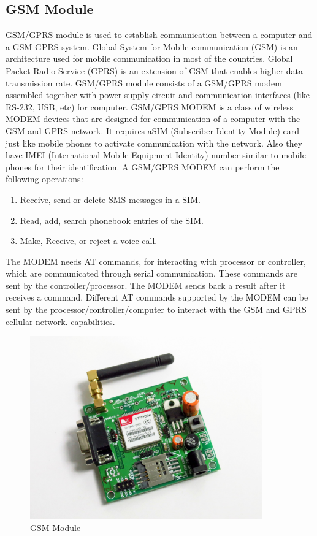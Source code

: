 \documentclass[twoside,a4paper,16pt]{book}
\begin{document}
{\subsection{GSM Module }
GSM/GPRS module is used to establish communication between a computer and a GSM-GPRS system. Global System for Mobile communication (GSM) is an architecture used for mobile communication in most of the countries. Global Packet Radio Service (GPRS) is an extension of GSM that enables higher data transmission rate. GSM/GPRS module consists of a GSM/GPRS modem assembled together with power supply circuit and communication interfaces (like RS-232, USB, etc) for computer. GSM/GPRS MODEM is a class of wireless MODEM devices that are designed for communication of a computer with the GSM and GPRS network. It requires aSIM (Subscriber Identity Module) card just like mobile phones to activate communication with the network. Also they have IMEI (International Mobile Equipment Identity) number similar to mobile phones for their identification. A GSM/GPRS MODEM can perform the following operations: 
\begin{enumerate}
	\item Receive, send or delete SMS messages in a SIM.
	\item Read, add, search phonebook entries of the SIM.
	\item Make, Receive, or reject a voice call.
\end{enumerate}
   

The MODEM needs AT commands, for interacting with processor or controller, which are communicated through serial communication. These commands are sent by the controller/processor. The MODEM sends back a result after it receives a command. Different AT commands supported by the MODEM can be sent by the processor/controller/computer to interact with the GSM and GPRS cellular network. capabilities.
\begin{figure}[ht!]
	\begin{center}
		\includegraphics[width=10.0cm]{12.jpg}
		\caption{GSM Module}
	\end{center}
\end{figure}
}
\end{document}
